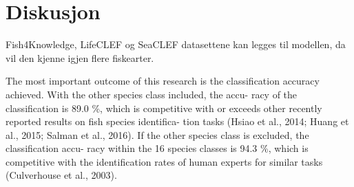 




\section{Diskusjon}

Fish4Knowledge, LifeCLEF og SeaCLEF datasettene kan legges til modellen, da vil den kjenne igjen flere fiskearter.

The most important outcome of this research is the classification accuracy achieved. With the other species class included, the accu- racy of the classification is 89.0 \%, which is competitive with or exceeds other recently reported results on fish species identifica- tion tasks (Hsiao et al., 2014; Huang et al., 2015; Salman et al., 2016). If the other species class is excluded, the classification accu- racy within the 16 species classes is 94.3 \%, which is competitive with the identification rates of human experts for similar tasks (Culverhouse et al., 2003).